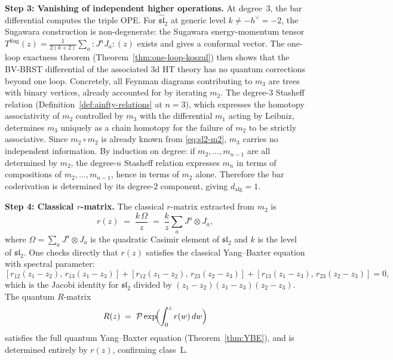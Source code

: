 \begin{computation}
\medskip
\noindent\textbf{Step 3: Vanishing of independent
 higher operations.}
At degree~$3$, the bar differential computes the triple
OPE. For $\hat{\mathfrak{sl}}_2$ at generic level
$k\neq -h^\vee = -2$, the Sugawara construction is
non-degenerate: the Sugawara energy-momentum tensor
$T^{\mathrm{Sug}}(z)=\frac{1}{2(k+2)}\sum_a
{:}\!J^a J_a\!{:}(z)$ exists and gives a conformal vector.
The one-loop exactness theorem
(Theorem~\ref{thm:one-loop-koszul}) then shows that the
BV-BRST differential of the associated 3d HT theory has
no quantum corrections beyond one loop. Concretely,
all Feynman diagrams contributing to $m_3$ are trees with
binary vertices, already accounted for by
iterating $m_2$. The degree-$3$ Stasheff relation
(Definition~\ref{def:ainfty-relations} at $n=3$), which expresses the homotopy associativity of $m_2$ controlled by $m_3$ with the differential $m_1$ acting by Leibniz, determines $m_3$ uniquely as a chain homotopy for the
failure of $m_2$ to be strictly associative. Since
$m_2\circ m_2$ is already known from \eqref{eq:sl2-m2},
$m_3$ carries no independent information. By induction on
degree: if $m_2,\ldots,m_{n-1}$ are all determined by
$m_2$, the degree-$n$ Stasheff relation expresses $m_n$ in
terms of compositions of $m_2,\ldots,m_{n-1}$, hence in
terms of $m_2$ alone. Therefore the bar coderivation is
determined by its degree-$2$ component, giving
$d_{\mathrm{alg}}=1$.

\medskip
\noindent\textbf{Step 4: Classical $r$-matrix.}
The classical $r$-matrix extracted from $m_2$ is
\begin{equation}\label{eq:sl2-r-matrix}
r(z) \;=\; \frac{k\,\Omega}{z}
\;=\; \frac{k}{z}\sum_{a} J^a \otimes J_a,
\end{equation}
where $\Omega = \sum_a J^a\otimes J_a$ is the quadratic
Casimir element of $\mathfrak{sl}_2$ and $k$ is the level
of $\widehat{\mathfrak{sl}}_2$. One checks directly
that $r(z)$ satisfies the classical Yang--Baxter equation
with spectral parameter:
\[
[r_{12}(z_1{-}z_2),\, r_{13}(z_1{-}z_3)]
+ [r_{12}(z_1{-}z_2),\, r_{23}(z_2{-}z_3)]
+ [r_{13}(z_1{-}z_3),\, r_{23}(z_2{-}z_3)]
= 0,
\]
which is the Jacobi identity for $\mathfrak{sl}_2$ divided
by $(z_1{-}z_2)(z_1{-}z_3)(z_2{-}z_3)$. The quantum
$R$-matrix
\begin{equation}\label{eq:sl2-R-matrix}
R(z) \;=\; \mathcal{P}\exp\!\Bigl(\int_0^z
r(w)\,dw\Bigr)
\end{equation}
satisfies the full quantum Yang--Baxter equation
(Theorem~\ref{thm:YBE}), and is determined entirely by
$r(z)$, confirming class~L.


\end{computation}

